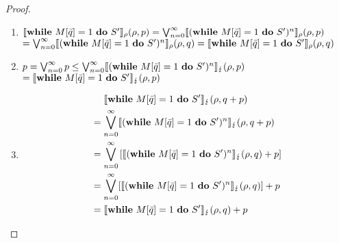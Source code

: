 \documentclass[a4paper,UKenglish,cleveref, autoref, thm-restate]{lipics-v2021}
\begin{document}
\begin{proof}
\begin{itemize}
        \begin{enumerate}
            \item $\semanticsRho{\while'}(\rho,p) = \bigvee_{n=0}^\infty \semanticsRho{(\while')^n} (\rho,p)$\\
            $= \bigvee_{n=0}^\infty \semanticsRho{(\while')^n} (\rho,q) = \semanticsRho{\while'}(\rho,q)$

            \item $p = \bigvee_{n=0}^\infty p \leq \bigvee_{n=0}^\infty \semanticsErr{(\while')^n} (\rho,p) $ \\
            $= \semanticsErr{\while'}(\rho,p)$

            \item
            \begin{align*}
                &\phantom{=.}\semanticsErr{\while'}(\rho,q+p) \\
                &= \bigvee_{n=0}^\infty \semanticsErr{(\while')^n} (\rho,q+p) \\
                &=\bigvee_{n=0}^\infty \left[\semanticsErr{(\while')^n} (\rho,q)+p\right]\\
                &= \bigvee_{n=0}^\infty [\semanticsErr{(\while')^n} (\rho,q)]+p\\
                &= \semanticsErr{\while'}(\rho,q) + p
            \end{align*}


\end{enumerate}
\end{itemize}
\end{proof}
\end{document}

